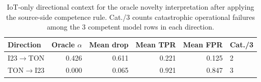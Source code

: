 \begin{table}[htbp]
\centering
\scriptsize
\setlength{\tabcolsep}{4pt}
\caption{IoT-only directional context for the oracle novelty interpretation after applying the source-side competence rule. Cat./3 counts catastrophic operational failures among the 3 competent model rows in each direction.}
\label{tab:acsac-oracle-direction}
\begin{tabular}{lrrrrl}
\toprule
Direction & Oracle $\alpha$ & Mean drop & Mean TPR & Mean FPR & Cat./3 \\
\midrule
I23$\to$TON & 0.426 & 0.611 & 0.221 & 0.125 & 2 \\
TON$\to$I23 & 0.000 & 0.065 & 0.921 & 0.847 & 3 \\
\bottomrule
\end{tabular}
\end{table}
